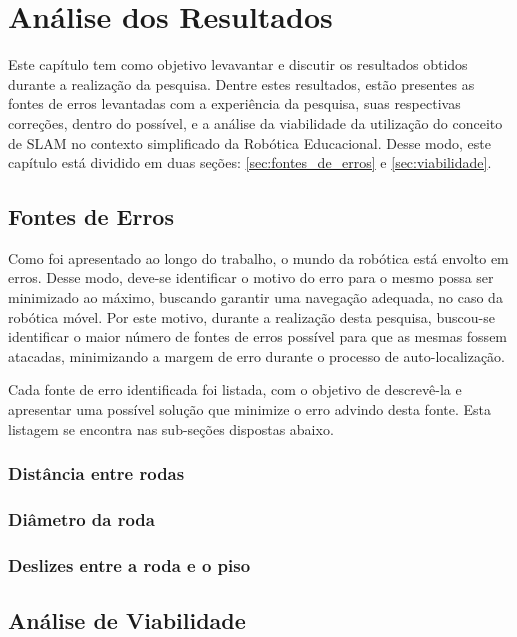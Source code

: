 \chapter[Análise dos Resultados]{Análise dos Resultados}

Este capítulo tem como objetivo levavantar e discutir os resultados obtidos durante a realização da pesquisa. Dentre estes resultados,
estão presentes as fontes de erros levantadas com a experiência da pesquisa, suas respectivas correções, dentro do possível, e a análise da
viabilidade da utilização do conceito de SLAM no contexto simplificado da Robótica Educacional. Desse modo, este capítulo está dividido
em duas seções: \ref{sec:fontes_de_erros} e \ref{sec:viabilidade}.

\section{Fontes de Erros}

Como foi apresentado ao longo do trabalho, o mundo da robótica está envolto em erros. Desse modo, deve-se identificar o motivo do erro
para o mesmo possa ser minimizado ao máximo, buscando garantir uma navegação adequada, no caso da robótica móvel.
Por este motivo, durante a realização desta pesquisa, buscou-se identificar o maior número de fontes de erros possível para que as mesmas fossem
atacadas, minimizando a margem de erro durante o processo de auto-localização.

Cada fonte de erro identificada foi listada, com o objetivo de descrevê-la e apresentar uma possível solução que minimize o erro
advindo desta fonte. Esta listagem se encontra nas sub-seções dispostas abaixo.

\subsection{Distância entre rodas}

\subsection{Diâmetro da roda}

\subsection{Deslizes entre a roda e o piso}

\section{Análise de Viabilidade}
